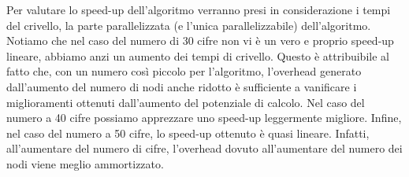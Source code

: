 Per valutare lo speed-up dell'algoritmo verranno presi in considerazione i tempi del crivello, la parte parallelizzata (e l'unica parallelizzabile) dell'algoritmo.
Notiamo che nel caso del numero di 30 cifre non vi è un vero e proprio speed-up lineare, abbiamo anzi un aumento dei tempi di crivello. Questo è attribuibile al fatto che, con un numero così piccolo per l'algoritmo, l'overhead generato dall'aumento del numero di nodi anche ridotto è sufficiente a vanificare i miglioramenti ottenuti dall'aumento del potenziale di calcolo.
Nel caso del numero a 40 cifre possiamo apprezzare uno speed-up leggermente migliore.
Infine, nel caso del numero a 50 cifre, lo speed-up ottenuto è quasi lineare.
Infatti, all'aumentare del numero di cifre, l'overhead dovuto all'aumentare del numero dei nodi viene meglio ammortizzato.